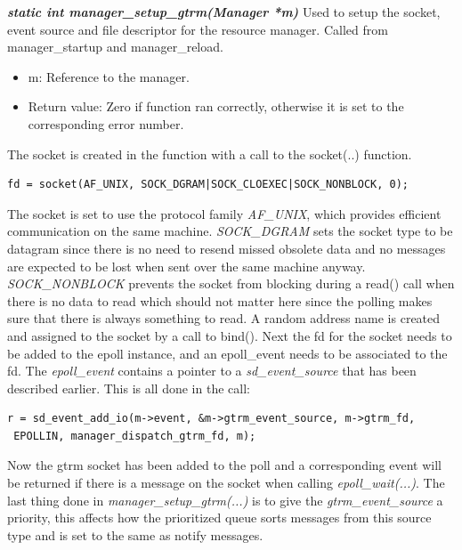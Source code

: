 \documentclass[nobiblatex]{LTHthesis}
\begin{document}
\begin{framed}
		\begin{flushleft}
		
			\textbf{\emph{{static int manager\_setup\_gtrm(Manager *m)}}} \newline
			Used to setup the socket, event source and file descriptor for the resource manager. Called from manager\_startup and manager\_reload.
			\begin{itemize}
			\item m: Reference to the manager.
			\item Return value: Zero if function ran correctly, otherwise it is set to the corresponding error number.
			\end{itemize}
		\end{flushleft}	
\end{framed}







The socket is created in the function  with a call to the socket(..) function.
\begin{verbatim}
fd = socket(AF_UNIX, SOCK_DGRAM|SOCK_CLOEXEC|SOCK_NONBLOCK, 0);
\end{verbatim}

The socket is set to use the protocol family \emph{AF\_UNIX}, which provides efficient communication on the same machine. \emph{SOCK\_DGRAM} sets the socket type to be datagram since there is no need to resend missed obsolete data and no messages are expected to be lost when sent over the same machine anyway. \emph{SOCK\_NONBLOCK} prevents the socket from blocking during a read() call when there is no data to read which should not matter here since the polling makes sure that there is always something to read. A random address name is created and assigned to the socket by a call to bind(). Next the fd for the socket needs to be added to the epoll instance, and an epoll\_event needs to be associated to the fd. The \emph{epoll\_event} contains a pointer to a \emph{sd\_event\_source} that has been described earlier. This is all done in the call:  

\begin{verbatim}
r = sd_event_add_io(m->event, &m->gtrm_event_source, m->gtrm_fd,
 EPOLLIN, manager_dispatch_gtrm_fd, m);
\end{verbatim}

Now the gtrm socket has been added to the poll and a corresponding event will be returned if there is a message on the socket when calling \emph{epoll\_wait(...)}. 
The last thing done in \emph{manager\_setup\_gtrm(...)} is to give the \emph{gtrm\_event\_source} a priority, this affects how the prioritized queue sorts messages from this source type and is set to the same as notify messages.
\end{document}
